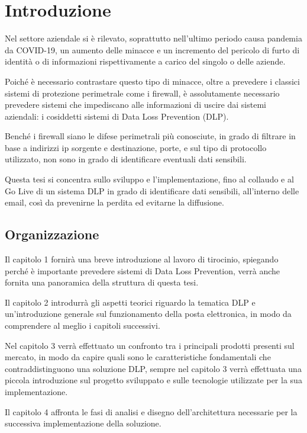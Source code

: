 \chapter{Introduzione}

Nel settore aziendale si è rilevato, soprattutto nell’ultimo periodo causa pandemia da COVID-19, un aumento delle minacce e un incremento del pericolo di furto di identità o di informazioni rispettivamente a carico del singolo o delle aziende.

Poiché è necessario contrastare questo tipo di minacce, oltre a prevedere i classici sistemi di protezione perimetrale come i firewall, è assolutamente necessario prevedere sistemi che impediscano alle informazioni di uscire dai sistemi aziendali: i cosiddetti sistemi di Data Loss Prevention (DLP).

Benché i firewall siano le difese perimetrali più conosciute, in grado di filtrare in base a indirizzi ip sorgente e destinazione, porte, e sul tipo di protocollo utilizzato, non sono in grado di identificare eventuali dati sensibili.

Questa tesi si concentra sullo sviluppo e l’implementazione, fino al collaudo e al Go Live di un sistema DLP in grado di identificare dati sensibili, all'interno delle email, così da prevenirne la perdita ed evitarne la diffusione.

\section{Organizzazione}

Il capitolo 1 fornirà una breve introduzione al lavoro di tirocinio, 
spiegando perché è importante prevedere sistemi di Data Loss Prevention, 
verrà anche fornita una panoramica della struttura di questa tesi.

Il capitolo 2 introdurrà gli aspetti teorici riguardo la tematica DLP e 
un'introduzione generale sul funzionamento della posta elettronica, 
in modo da comprendere al meglio i capitoli successivi.

Nel capitolo 3 verrà effettuato un confronto tra i principali prodotti presenti sul mercato, 
in modo da capire quali sono le caratteristiche fondamentali che contraddistinguono una soluzione DLP, 
sempre nel capitolo 3 verrà effettuata una piccola introduzione sul progetto sviluppato e sulle tecnologie 
utilizzate per la sua implementazione.

Il capitolo 4 affronta le fasi di analisi e disegno dell'architettura necessarie 
per la successiva implementazione della soluzione.

